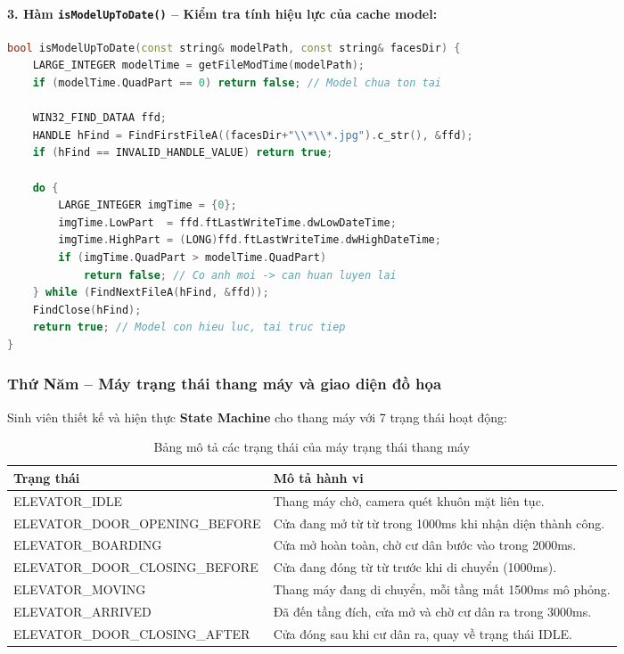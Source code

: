 \documentclass[12pt,a4paper]{article}
\begin{document}
\paragraph{3. Hàm \texttt{isModelUpToDate()} -- Kiểm tra tính hiệu lực của cache model:}
\begin{lstlisting}[language=C++, caption={So sánh thời gian file model và ảnh mẫu}]
bool isModelUpToDate(const string& modelPath, const string& facesDir) {
    LARGE_INTEGER modelTime = getFileModTime(modelPath);
    if (modelTime.QuadPart == 0) return false; // Model chua ton tai

    WIN32_FIND_DATAA ffd;
    HANDLE hFind = FindFirstFileA((facesDir+"\\*\\*.jpg").c_str(), &ffd);
    if (hFind == INVALID_HANDLE_VALUE) return true;

    do {
        LARGE_INTEGER imgTime = {0};
        imgTime.LowPart  = ffd.ftLastWriteTime.dwLowDateTime;
        imgTime.HighPart = (LONG)ffd.ftLastWriteTime.dwHighDateTime;
        if (imgTime.QuadPart > modelTime.QuadPart)
            return false; // Co anh moi -> can huan luyen lai
    } while (FindNextFileA(hFind, &ffd));
    FindClose(hFind);
    return true; // Model con hieu luc, tai truc tiep
}
\end{lstlisting}

\subsubsection{Thứ Năm -- Máy trạng thái thang máy và giao diện đồ họa}

Sinh viên thiết kế và hiện thực \textbf{State Machine} cho thang máy với 7 trạng thái hoạt động:

\begin{table}[H]
    \centering
    \renewcommand{\arraystretch}{1.4}
    \begin{tabular}{|>{\ttfamily}p{5.5cm}|p{9cm}|}
        \hline
        \rowcolor{lightblue}
        \textbf{Trạng thái} & \textbf{Mô tả hành vi} \\
        \hline
        ELEVATOR\_IDLE & Thang máy chờ, camera quét khuôn mặt liên tục. \\
        \hline
        ELEVATOR\_DOOR\_OPENING\_BEFORE & Cửa đang mở từ từ trong 1000ms khi nhận diện thành công. \\
        \hline
        ELEVATOR\_BOARDING & Cửa mở hoàn toàn, chờ cư dân bước vào trong 2000ms. \\
        \hline
        ELEVATOR\_DOOR\_CLOSING\_BEFORE & Cửa đang đóng từ từ trước khi di chuyển (1000ms). \\
        \hline
        ELEVATOR\_MOVING & Thang máy đang di chuyển, mỗi tầng mất 1500ms mô phỏng. \\
        \hline
        ELEVATOR\_ARRIVED & Đã đến tầng đích, cửa mở và chờ cư dân ra trong 3000ms. \\
        \hline
        ELEVATOR\_DOOR\_CLOSING\_AFTER & Cửa đóng sau khi cư dân ra, quay về trạng thái IDLE. \\
        \hline
    \end{tabular}
    \caption{Bảng mô tả các trạng thái của máy trạng thái thang máy}
\end{table}
\end{document}
